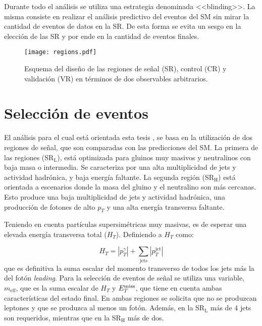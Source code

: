 Durante todo el análisis se utiliza una estrategia denominada <<blinding>>. La misma consiste en realizar el análisis predictivo del eventos del SM sin mirar la cantidad de eventos de datos en la SR. De esta forma se evita un sesgo en la elección de las SR y por ende en la cantidad de eventos finales.

\begin{figure}
\centering
\texttt{[image: regions.pdf]}
\caption{Esquema del diseño de las regiones de señal (SR), control (CR) y validación (VR) en términos de dos observables arbitrarios.}
\label{regions}
\end{figure}

\section{Selección de eventos}

El análisis para el cual está orientada esta tesis \cite{Collaboration:2198651}, se basa en la utilización de dos regiones de señal, que son comparadas con las predicciones del SM. La primera de las regiones (SR$_{\text{L}}$), está optimizada para gluinos muy masivos y neutralinos con baja masa o intermedia. Se caracteriza por una alta multiplicidad de jets y actividad hadrónica, y baja energía faltante. La segunda región (SR$_{\text{H}}$) está orientada a escenarios donde la masa del gluino y el neutralino son más cercanas. Esto produce una baja multiplicidad de jets y actividad hadrónica, una producción de fotones de alto $p_{T}$ y una alta energía transversa faltante.

Teniendo en cuenta partículas supersimétricas muy masivas, es de esperar una elevada energía transversa total ($H_{T}$). Definiendo a $H_{T}$ como:

\begin{equation}
H_{T}=|p_{T}^{\gamma}|+\sum_{\text{jets}}|p_{T}^{\text{jet}}|
\end{equation} 
que es definitiva la suma escalar del momento transverso de todos los jets más la del fotón \textit{leading}. Para la selección de eventos de señal se utiliza una variable, $m_{\text{eff}}$, que es la suma escalar de $H_{T}$ y $E_{T}^{\text{miss}}$, que tiene en cuenta ambas características del estado final. En ambas regiones se solicita que no se produzcan leptones y que se produzca al menos un fotón. Además, en la SR$_{\text{L}}$ más de 4 jets son requeridos, mientras que en la SR$_{\text{H}}$ más de dos.

